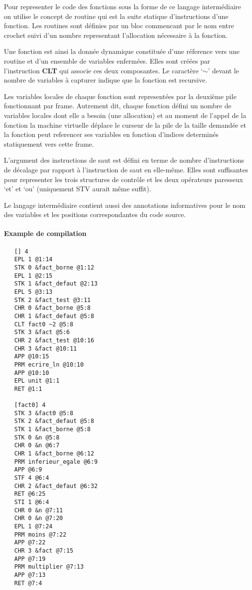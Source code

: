 Pour representer le code des fonctions sous la forme de ce langage intermédiaire on
utilise le concept de routine qui est la suite statique d'instructions d'une fonction.
Les routines sont définies par un bloc commencant par le nom entre crochet suivi
d'un nombre representant l'allocation nécessaire à la fonction.

Une fonction est ainsi la donnée dynamique constituée d'une réference vers une
routine et d'un ensemble de variables enfermées. Elles sont créées par l'instruction
\textbf{CLT} qui associe ces deux composantes. Le caractère `$\sim$' devant le
nombre de variables à capturer indique que la fonction est recursive.

Les variables locales de chaque fonction sont representées par la deuxième pile
fonctionnant par frame. Autrement dit, chaque fonction défini un nombre de variables
locales dont elle a besoin (une allocation) et au moment de l'appel de la fonction
la machine virtuelle déplace le curseur de la pile de la taille demandée et la fonction
peut referencer ses variables en fonction d'indices determinés statiquement vers cette frame.

L'argument des instructions de saut est défini en terme de nombre d'instructions de décalage
par rapport à l'instruction de saut en elle-même. Elles sont suffisantes pour representer
les trois structures de contrôle et les deux opérateurs paresseux `et' et `ou' (uniquement STV
aurait même suffit).

Le langage intermédiaire contient aussi des annotations informatives pour le nom des
variables et les positions correspondantes du code source.

\paragraph{Example de compilation}
\begin{verbatim}
   [] 4
   EPL 1 @1:14
   STK 0 &fact_borne @1:12
   EPL 1 @2:15
   STK 1 &fact_defaut @2:13
   EPL 5 @3:13
   STK 2 &fact_test @3:11
   CHR 0 &fact_borne @5:8
   CHR 1 &fact_defaut @5:8
   CLT fact0 ~2 @5:8
   STK 3 &fact @5:6
   CHR 2 &fact_test @10:16
   CHR 3 &fact @10:11
   APP @10:15
   PRM ecrire_ln @10:10
   APP @10:10
   EPL unit @1:1
   RET @1:1

   [fact0] 4
   STK 3 &fact0 @5:8
   STK 2 &fact_defaut @5:8
   STK 1 &fact_borne @5:8
   STK 0 &n @5:8
   CHR 0 &n @6:7
   CHR 1 &fact_borne @6:12
   PRM inferieur_egale @6:9
   APP @6:9
   STF 4 @6:4
   CHR 2 &fact_defaut @6:32
   RET @6:25
   STI 1 @6:4
   CHR 0 &n @7:11
   CHR 0 &n @7:20
   EPL 1 @7:24
   PRM moins @7:22
   APP @7:22
   CHR 3 &fact @7:15
   APP @7:19
   PRM multiplier @7:13
   APP @7:13
   RET @7:4
\end{verbatim}
